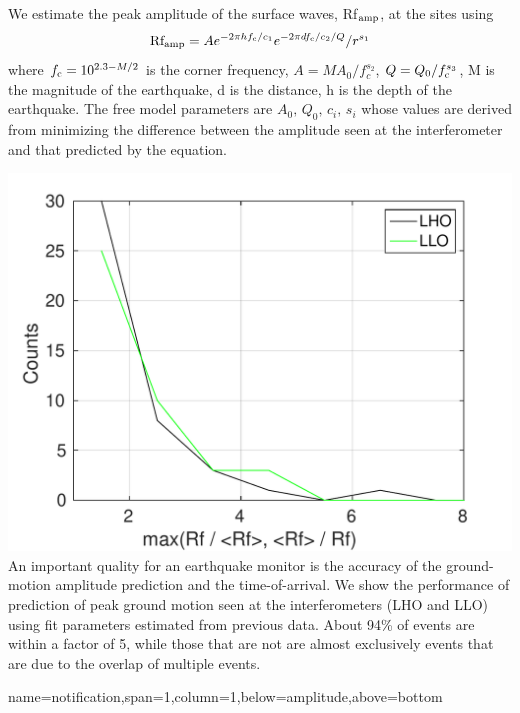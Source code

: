 \documentclass[a0paper,portrait]{baposter}
\begin{document}
\begin{poster}
{We estimate the peak amplitude of the surface waves, Rf$_{\rm amp}$, at the sites using
\begin{equation}
{\rm Rf_{amp}} = A e^{-2 \pi h f_{\rm c}/c_1}e^{-2 \pi d f_{\rm c}/c_2/Q}/r^{s_1}
\label{eq:Rfamp}
\end{equation}
where $f_{\rm c} = 10^{2.3-M/2}$ is the corner frequency, $A = M A_0/f_c^{s_2}$, $Q=Q_0/f_{\rm c}^{s_3}$, M is the magnitude of the earthquake, d is the distance, h is the depth of the earthquake. The free model parameters are $A_0,\,Q_0,\,c_i,\,s_i$ whose values are derived from minimizing the difference between the amplitude seen at the interferometer and that predicted by the equation.

 \includegraphics[width=0.99\linewidth]{plots/pred_diff.pdf}
An important quality for an earthquake monitor is the accuracy of the ground-motion amplitude prediction and the time-of-arrival. We show the performance of prediction of peak ground motion seen at the interferometers (LHO and LLO) using fit parameters estimated from previous data. About 94\% of events are within a factor of 5, while those that are not are almost exclusively events that are due to the overlap of multiple events. 

}

{name=notification,span=1,column=1,below=amplitude,above=bottom}{

}
\end{poster}
\end{document}
